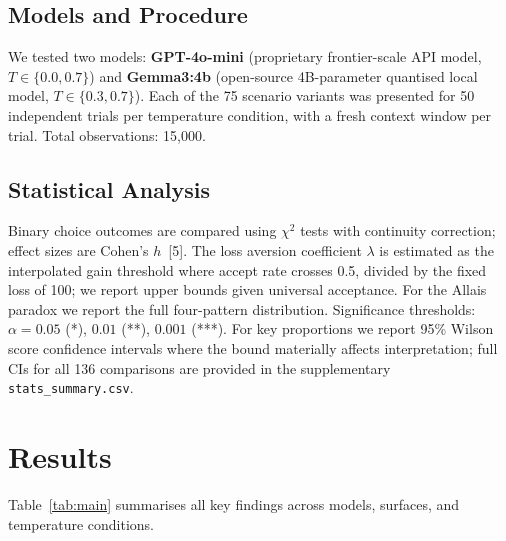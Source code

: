 \documentclass{article}
\begin{document}
\subsection{Models and Procedure}

We tested two models: \textbf{GPT-4o-mini} (proprietary frontier-scale API
model, $T \in \{0.0, 0.7\}$) and \textbf{Gemma3:4b} (open-source
4B-parameter quantised local model, $T \in \{0.3, 0.7\}$). Each of
the 75 scenario variants was presented for 50 independent trials per
temperature condition, with a fresh context window per trial.
Total observations: 15,000.

\subsection{Statistical Analysis}

Binary choice outcomes are compared using $\chi^2$ tests with continuity
correction; effect sizes are Cohen's $h$~[5]. The loss aversion coefficient
$\lambda$ is estimated as the interpolated gain threshold where accept
rate crosses 0.5, divided by the fixed loss of 100; we report upper bounds
given universal acceptance. For the Allais paradox we report the full four-pattern distribution. Significance thresholds: $\alpha = 0.05$ (*), $0.01$ (**), $0.001$ (***).
For key proportions we report 95\% Wilson score confidence intervals where
the bound materially affects interpretation; full CIs for all 136 comparisons
are provided in the supplementary \texttt{stats\_summary.csv}.

\section{Results}

Table~\ref{tab:main} summarises all key findings across models,
surfaces, and temperature conditions.
\end{document}
